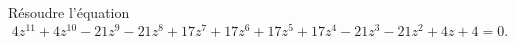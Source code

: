 Résoudre l'équation
\[ 4z^{11} + 4z^{10} - 21z^9 - 21z^8 + 17z^7 + 17z^6 + 17z^5 + 17z^4 - 21z^3 - 21z^2 + 4z + 4 = 0. \]
